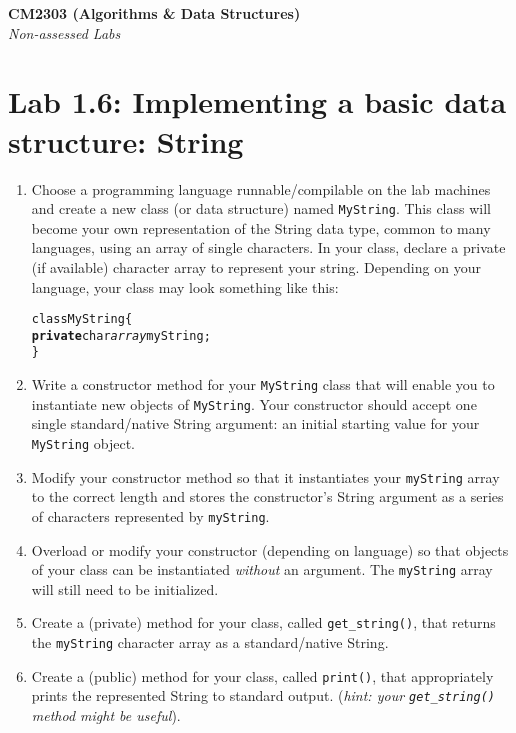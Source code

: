 \documentclass[11pt,a4paper]{report}
\begin{document}
\noindent\Large\textbf{CM2303 (Algorithms \& Data Structures)}\\
\noindent\large\textit{Non-assessed Labs}
\vskip30pt

\section*{Lab 1.6: Implementing a basic data structure: String}
\begin{enumerate}

    \item Choose a programming language runnable/compilable on the lab machines and create a new class (or data structure) named \texttt{MyString}. This class will become your own representation of the String data type, common to many languages, using an array of single characters. In your class, declare a private (if available) character array to represent your string. Depending on your language, your class may look something like this:
\begin{alltt}
class MyString \{
    \textbf{private} char \textit{array} myString;
\}
\end{alltt}

    \item Write a constructor method for your \texttt{MyString} class that will enable you to instantiate new objects of \texttt{MyString}. Your constructor should accept one single standard/native String argument: an initial starting value for your \texttt{MyString} object.
    
    \item Modify your constructor method so that it instantiates your \texttt{myString} array to the correct length and stores the constructor's String argument as a series of characters represented by \texttt{myString}.

    \item Overload or modify your constructor (depending on language) so that objects of your class can be instantiated \textit{without} an argument. The \texttt{myString} array will still need to be initialized.

    \item Create a (private) method for your class, called \texttt{get\_string()}, that returns the \texttt{myString} character array as a standard/native String.

    \item Create a (public) method for your class, called \texttt{print()}, that appropriately prints the represented String to standard output. (\textit{hint: your \texttt{get\_string()} method might be useful}).


\end{enumerate}
\end{document}
